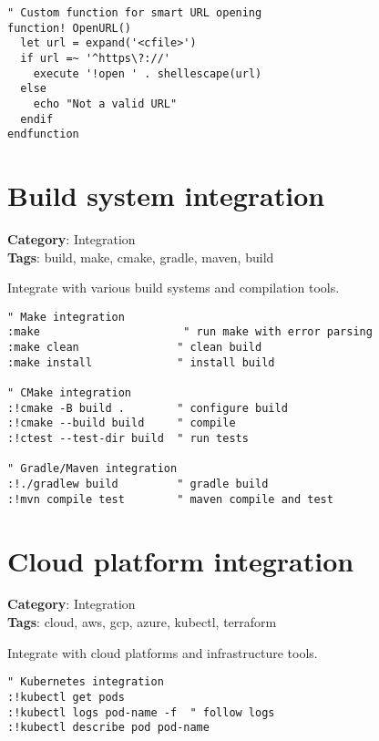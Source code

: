 {{{{{{\begin{Exa*}{}
\begin{Verbatim}[fontsize=\footnotesize, breaklines, breakanywhere]
" Custom function for smart URL opening
function! OpenURL()
  let url = expand('<cfile>')
  if url =~ '^https\?://'
    execute '!open ' . shellescape(url)
  else
    echo "Not a valid URL"
  endif
endfunction
\end{Verbatim}
\end{Exa*}

\section{Build system integration}

\textbf{Category}: Integration\\ \textbf{Tags}: build, make, cmake, gradle, maven, build
\vspace{0.5cm}

Integrate with various build systems and compilation tools.

\begin{Exa*}{}
\begin{Verbatim}[fontsize=\footnotesize, breaklines, breakanywhere]
" Make integration
:make                      " run make with error parsing
:make clean               " clean build
:make install             " install build

" CMake integration  
:!cmake -B build .        " configure build
:!cmake --build build     " compile
:!ctest --test-dir build  " run tests

" Gradle/Maven integration
:!./gradlew build         " gradle build
:!mvn compile test        " maven compile and test
\end{Verbatim}
\end{Exa*}

\section{Cloud platform integration}

\textbf{Category}: Integration\\ \textbf{Tags}: cloud, aws, gcp, azure, kubectl, terraform
\vspace{0.5cm}

Integrate with cloud platforms and infrastructure tools.

\begin{Exa*}{}
\begin{Verbatim}[fontsize=\footnotesize, breaklines, breakanywhere]
" Kubernetes integration
:!kubectl get pods
:!kubectl logs pod-name -f  " follow logs
:!kubectl describe pod pod-name


\end{Verbatim}
\end{Exa*}}}}}}}
